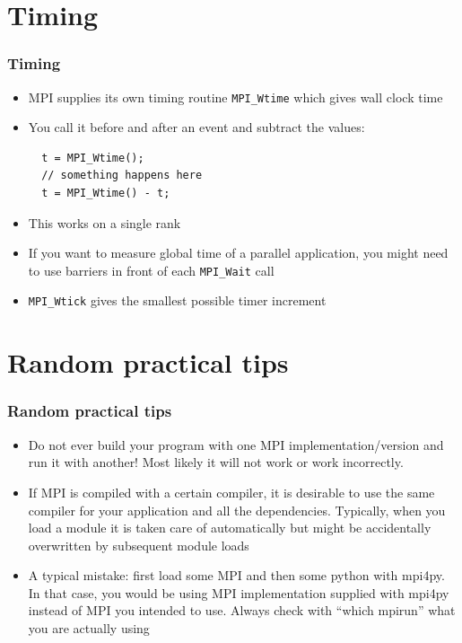 \documentclass{beamer}
\begin{document}



\section{Timing}
\begin{frame}[fragile]
  \frametitle{Timing}
\begin{itemize}
\item MPI supplies its own timing routine {\color{mycolorcode}\verb|MPI_Wtime|} which gives wall clock time
\item You call it before and after an event and subtract the values:
{\color{mycolorcode}
\begin{verbatim}
  t = MPI_Wtime();
  // something happens here
  t = MPI_Wtime() - t;
\end{verbatim}
}
\item This works on a single rank
\item If you want to measure global time of a parallel application, you might need to use barriers in front of each {\color{mycolorcode}\verb|MPI_Wait|} call
\item {\color{mycolorcode}\verb|MPI_Wtick|} gives the smallest possible timer increment
\end{itemize}
\end{frame}



\section{Random practical tips}
\begin{frame}[fragile]
  \frametitle{Random practical tips}
\begin{itemize}
\item Do not ever build your program with one MPI implementation/version and run it with another! Most likely it will not work or work incorrectly.
\item If MPI is compiled with a certain compiler, it is desirable to use the same compiler for your application and all the dependencies. Typically, when you load a module it is taken care of automatically but might be accidentally 
  overwritten by subsequent module loads
\item A typical mistake: first load some MPI and then some python with mpi4py. In that case, you would be using MPI implementation supplied with mpi4py instead of MPI you intended to use. 
Always check with ``{\color{mycolorcli}which mpirun}'' what you are actually 
using
\end{itemize}
\end{frame}
\end{document}
